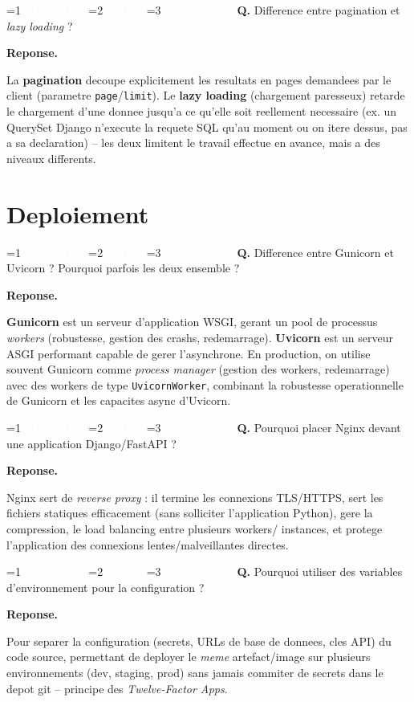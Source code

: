 \documentclass[11pt,a4paper]{article}
\newcommand{\badgeJ}{\textcolor{white}{\colorbox{junior}{\small\bfseries\ JUNIOR\ }}}
\newcommand{\badgeM}{\textcolor{white}{\colorbox{mid}{\small\bfseries\ MID\ }}}
\newcommand{\badgeS}{\textcolor{white}{\colorbox{senior}{\small\bfseries\ SENIOR\ }}}
\newcounter{qcount}
\newenvironment{qa}[2]{%
  \stepcounter{qcount}%
  \par\vspace{6pt}%
  \noindent\colorbox{qbg}{\parbox{\dimexpr\linewidth-12pt}{\vspace{2pt}%
  \ifnum#1=1 \badgeJ\fi\ifnum#1=2 \badgeM\fi\ifnum#1=3 \badgeS\fi
  \ \textbf{Q\theqcount.} #2\vspace{2pt}}}\par\vspace{4pt}%
  \noindent\textbf{\color{accent}Reponse.}\ \ignorespaces
}{%
  \par\vspace{8pt}%
}
\begin{document}
\begin{qa}{2}{Difference entre pagination et \emph{lazy loading} ?}
La \textbf{pagination} decoupe explicitement les resultats en pages
demandees par le client (parametre \texttt{page}/\texttt{limit}). Le
\textbf{lazy loading} (chargement paresseux) retarde le chargement d'une
donnee jusqu'a ce qu'elle soit reellement necessaire (ex. un QuerySet Django
n'execute la requete SQL qu'au moment ou on itere dessus, pas a sa
declaration) -- les deux limitent le travail effectue en avance, mais a des
niveaux differents.
\end{qa}

\newpage
\section{Deploiement}

\begin{qa}{1}{Difference entre Gunicorn et Uvicorn ? Pourquoi parfois les deux ensemble ?}
\textbf{Gunicorn} est un serveur d'application WSGI, gerant un pool de
processus \emph{workers} (robustesse, gestion des crashs, redemarrage).
\textbf{Uvicorn} est un serveur ASGI performant capable de gerer l'asynchrone.
En production, on utilise souvent Gunicorn comme \emph{process manager}
(gestion des workers, redemarrage) avec des workers de type
\texttt{UvicornWorker}, combinant la robustesse operationnelle de Gunicorn et
les capacites async d'Uvicorn.
\end{qa}

\begin{qa}{2}{Pourquoi placer Nginx devant une application Django/FastAPI ?}
Nginx sert de \emph{reverse proxy} : il termine les connexions TLS/HTTPS,
sert les fichiers statiques efficacement (sans solliciter l'application
Python), gere la compression, le load balancing entre plusieurs workers/
instances, et protege l'application des connexions lentes/malveillantes
directes.
\end{qa}

\begin{qa}{2}{Pourquoi utiliser des variables d'environnement pour la configuration ?}
Pour separer la configuration (secrets, URLs de base de donnees, cles API)
du code source, permettant de deployer le \emph{meme} artefact/image sur
plusieurs environnements (dev, staging, prod) sans jamais commiter de secrets
dans le depot git -- principe des \emph{Twelve-Factor Apps}.
\end{qa}
\end{document}
